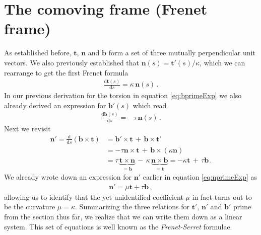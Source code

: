 \documentclass[11pt, DINA4, fleqn]{amsart}
\def\df{\mathrm{d}\xspace}
\newcommand{\dd}[2]{\frac{\df#1}{\df#2}}
\def\vt{\boldsymbol{t}\xspace}
\def\vn{\boldsymbol{n}\xspace}
\def\vb{\boldsymbol{b}\xspace}
\begin{document}
\section{The comoving frame (Frenet frame)}
As established before, $\vt$, $\vn$ and $\vb$ form a set of three mutually perpendicular unit vectors. 
We also previously established that
$\vn(s) = \vt'(s) / \kappa$, which we can rearrange to get the first Frenet formula
\begin{align}
\dd{\vt(s)}{s} =  \kappa \, \vn(s) \, .
\end{align}
In our previous derivation for the torsion in equation \eqref{eq:bprimeExp} we also already derived an expression for $\vb'(s)$ which read
\begin{align}
\dd{\vb(s)}{s} = -\tau \, \vn(s) \, .
\end{align}
Next we revisit
\begin{align}
\vn' = \dd{}{s} \left(\vb \times \vt\right) &= \vb' \times \vt \, + \, \vb \times \vt' \\
&= -\tau \vn \times \vt \, + \, \vb \times \left(\kappa \vn\right) \\
&= \tau \, \underbrace{\vt \times \vn}_{=\vb} \, -  \, \kappa \, \underbrace{\vn\times\vb}_{=\vt}
= -\kappa \vt \, + \, \tau \vb \, .
\end{align}
We already wrote down an expression for $\vn'$ earlier in equation \eqref{eq:nprimeExp} as
\begin{align}
\vn' = \mu \vt + \tau \vb \, ,
\end{align}
allowing us to identify that the yet unidentified coefficient $\mu$ in fact turns out to be the curvature $\mu = \kappa$.
Summarizing the three relations for $\vt'$, $\vn'$ and $\vb'$ prime from the section thus far, we realize that we can write them down as a linear system.
This set of equations is well known as the \emph{Frenet-Serret} formulae.
\end{document}
